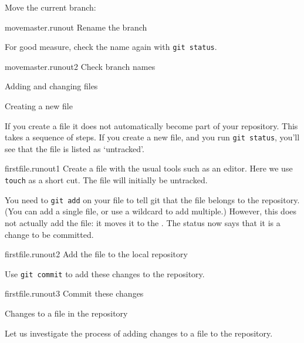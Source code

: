 Move the current branch:

\begin{gitstep}{movemaster.runout}
  Rename the branch
\end{gitstep}

For good measure, check the name again with \lstinline{git status}.

\begin{gitstep}{movemaster.runout2}
  Check branch names
\end{gitstep}

\newpage
{} {Adding and changing files}
\label{sec:hg-push}

 {Creating a new file}

If you create a file it does not automatically become part of your repository.
This takes a sequence of steps.
If you create a new file, and you run \lstinline{git status},
you'll see that the file is listed as `untracked'.

\begin{gitstep}{firstfile.runout1}
  Create a file with the usual tools such as an editor.
  Here we use \lstinline{touch} as a short cut.
  The file will initially be untracked.
\end{gitstep}

You need to \lstinline{git add} on your file to tell git that the file
belongs to the repository.
(You can add a single file, or use a wildcard to add multiple.)
However, this does not actually add the file:
it moves it to the .
The status now says that it is a change to be committed.

\begin{gitstep}{firstfile.runout2}
  Add the file to the local repository
\end{gitstep}

Use \lstinline{git commit} to add these changes to the repository.

\begin{gitstep}{firstfile.runout3}
  Commit these changes
\end{gitstep}

\newpage
{} {Changes to a file in the repository}

Let us investigate the process of adding changes to a file to the repository.

